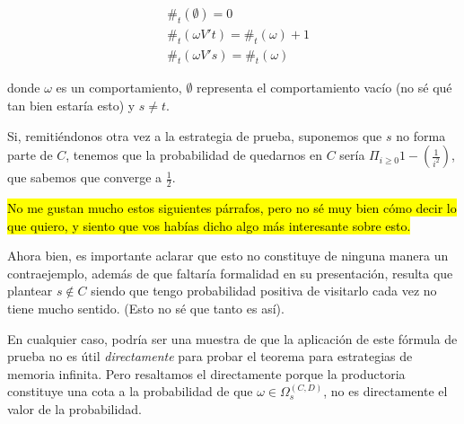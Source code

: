 \begin{align*}
	&\#_t(\emptyset) = 0 \\
	&\#_t(\omega V' t) = \#_t(\omega) + 1 \\
	&\#_t(\omega V' s) = \#_t(\omega)
\end{align*}

donde $\omega$ es un comportamiento, $\emptyset$ representa el comportamiento
vacío (no sé qué tan bien estaría esto) y $s \neq t$.

Si, remitiéndonos otra vez a la estrategia de prueba, suponemos que $s$ no
forma parte de $C$, tenemos que la probabilidad de quedarnos en $C$ sería
$\Pi_{i \geq 0} 1-(\frac{1}{i^2})$, que sabemos que converge a $\frac{1}{2}$.

\hl{No me gustan mucho estos siguientes párrafos, pero no sé muy bien cómo decir lo que quiero, y siento que vos habías dicho algo más interesante sobre esto.}

Ahora bien, es importante aclarar que esto no constituye de ninguna manera un
contraejemplo, además de que faltaría formalidad en su presentación, resulta
que plantear $s \notin C$ siendo que tengo probabilidad positiva de visitarlo
cada vez no tiene mucho sentido. (Esto no sé que tanto es así).

En cualquier caso, podría ser una muestra de que la aplicación de este fórmula
de prueba no es útil \textit{directamente} para probar el teorema para
estrategias de memoria infinita. Pero resaltamos el directamente porque la
productoria constituye una cota a la probabilidad de que $\omega \in
	\Omega_s^{(C,D)}$, no es directamente el valor de la probabilidad.

